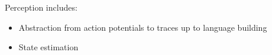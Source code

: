 \begin{frame}{Perception}
    includes:
    \begin{itemize}
        \item Abstraction from action potentials to traces up to language building
        \item State estimation
    \end{itemize}
\end{frame}